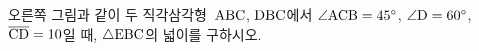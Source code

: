 \noindent\begin{minipage}[t]{0.58\linewidth}\vspace{0pt}\raggedright 오른쪽 그림과 같이 두 직각삼각형~$\mathrm{ABC}$, $\mathrm{DBC}$에서 $\angle\mathrm{ACB}=45^\circ$, $\angle\mathrm{D}=60^\circ$, $\overline{\mathrm{CD}}=10$일 때, $\triangle\mathrm{EBC}$의 넓이를 구하시오.\end{minipage}\hfill\begin{minipage}[t]{0.4\linewidth}\vspace{0pt}\centering \resizebox{\ifdim\width>\linewidth\linewidth\else\width\fi}{!}{}\end{minipage}\par
